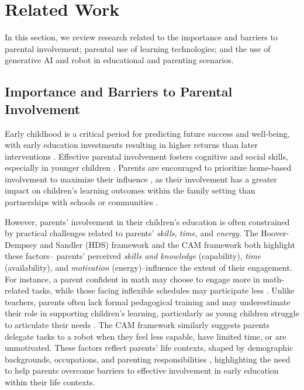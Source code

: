 \section{Related Work}

In this section, we review research related to the importance and barriers to parental involvement; parental use of learning technologies; and the use of generative AI and robot in educational and parenting scenarios.

\subsection{Importance and Barriers to Parental Involvement}\label{sec-rw-2.1}

Early childhood is a critical period for predicting future success and well-being, with early education investments resulting in higher returns than later interventions \cite{duncan2007school, doyle2009investing}. Effective parental involvement fosters cognitive and social skills, especially in younger children \cite{blevins2016early, peck1992parent}. Parents are encouraged to prioritize home-based involvement to maximize their influence \cite{ma2016meta}, as their involvement has a greater impact on children's learning outcomes \cite{hoffner2002parents, fehrmann1987home, hill2004parent} within the family setting than partnerships with schools or communities \cite{ma2016meta, harris2008parents, fantuzzo2004multiple, sui1996effects}.

However, parents' involvement in their children's education is often constrained by practical challenges related to parents' \textit{skills}, \textit{time}, and \textit{energy}. The Hoover-Dempsey and Sandler (HDS) framework \cite{green2007parents} and the CAM framework \cite{ho2024s} both highlight these factors-- parents' perceived \textit{skills and knowledge} (capability), \textit{time} (availability), and \textit{motivation} (energy)--influence the extent of their engagement. For instance, a parent confident in math may choose to engage more in math-related tasks, while those facing inflexible schedules may participate less \cite{green2007parents}. Unlike teachers, parents often lack formal pedagogical training and may underestimate their role in supporting children's learning, particularly as young children struggle to articulate their needs \cite{hara1998parent}. The CAM framework similarly suggests parents delegate tasks to a robot when they feel less capable, have limited time, or are unmotivated. These factors reflect parents' life contexts, shaped by demographic backgrounds, occupations, and parenting responsibilities \cite{grolnick1997predictors}, highlighting the need to help parents overcome barriers to effective involvement in early education within their life contexts.

